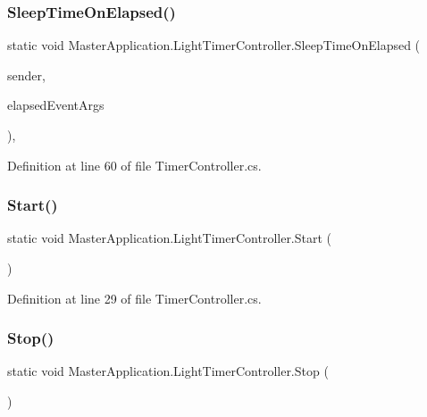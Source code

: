 \subsubsection{\texorpdfstring{Sleep\+Time\+On\+Elapsed()}{SleepTimeOnElapsed()}}
{\footnotesize\ttfamily static void Master\+Application.\+Light\+Timer\+Controller.\+Sleep\+Time\+On\+Elapsed (\begin{DoxyParamCaption}\item[{object}]{sender,  }\item[{Elapsed\+Event\+Args}]{elapsed\+Event\+Args }\end{DoxyParamCaption})\hspace{0.3cm}{\ttfamily [static]}, {\ttfamily [private]}}



Definition at line 60 of file Timer\+Controller.\+cs.

\mbox{\label{class_master_application_1_1_light_timer_controller_a9453948c870b922fb6a5080847e4ca90}} 
\subsubsection{\texorpdfstring{Start()}{Start()}}
{\footnotesize\ttfamily static void Master\+Application.\+Light\+Timer\+Controller.\+Start (\begin{DoxyParamCaption}{ }\end{DoxyParamCaption})\hspace{0.3cm}{\ttfamily [static]}}



Definition at line 29 of file Timer\+Controller.\+cs.

\mbox{\label{class_master_application_1_1_light_timer_controller_a0538817a522b0b7f65c0a85f749e7c8a}} 
\subsubsection{\texorpdfstring{Stop()}{Stop()}}
{\footnotesize\ttfamily static void Master\+Application.\+Light\+Timer\+Controller.\+Stop (\begin{DoxyParamCaption}{ }\end{DoxyParamCaption})\hspace{0.3cm}{\ttfamily [static]}}



